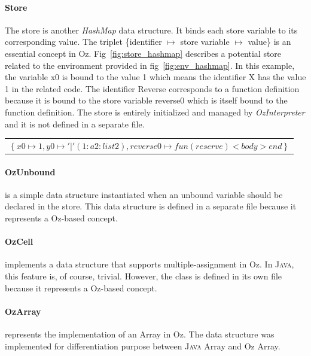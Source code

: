 \documentclass[11pt,a4paper,twoside,openright]{report}
\begin{document}
\paragraph{Store}
The store is another \textit{HashMap} data structure. It binds each store 
variable to its corresponding value. The triplet \{identifier $\mapsto$ store 
variable $\mapsto$ value\} is an essential concept in Oz. 
Fig~\ref{fig:store_hashmap} describes a potential store related to the 
environment provided in fig~\ref{fig:env_hashmap}. In this example, the 
variable x0 is bound to the value 1 which means the identifier X has the value 1 
in the related code. The identifier Reverse corresponds to a function 
definition because it is bound to the store variable reverse0 which is itself 
bound to the function definition. The store is entirely initialized 
and managed by \textit{OzInterpreter} and it is not defined in a separate 
file.\\
\begin{center}
 \begin{tabular}{l}
    $\left\{x0\mapsto 1,y0\mapsto{ } '\vert'(1:a 2:list2),reverse0\mapsto{ } 
fun(reserve) 
<body> end\right\}$
 \end{tabular}
 \label{fig:store_hashmap}
\end{center}

\paragraph{OzUnbound}
is a simple data structure instantiated when an unbound variable should be 
declared in the store. This data structure is defined in a separate file 
because it represents a Oz-based concept.

\paragraph{OzCell}
implements a data structure that supports multiple-assignment in Oz. 
In \textsc{Java}, this feature is, of course, trivial. However, the class is 
defined in its own file because it represents a Oz-based concept.

\paragraph{OzArray}
represents the implementation of an Array in Oz. The data structure was 
implemented for differentiation purpose between \textsc{Java} 
Array and Oz Array.
\end{document}
